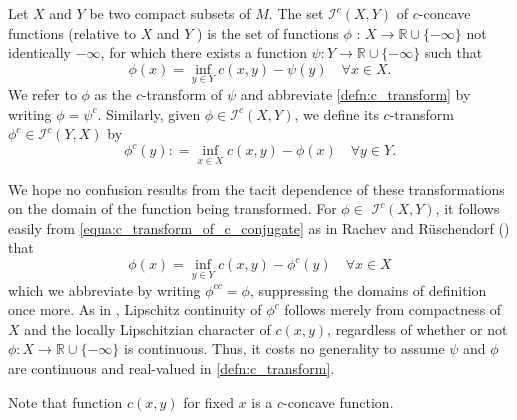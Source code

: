 \begin{defn} 
	Let \( X \) and \( Y \) be two compact subsets of \( M \).
	The set \( \mathcal{I} ^ { c } ( X , Y ) \) of \( c \)-concave functions (relative to \( X \) and \( Y \) ) is
	the set of functions \( \phi \) : \( X \rightarrow \mathbb { R } \cup \{ - \infty \} \) not identically \( - \infty \),
	for which there exists a function \( \psi : Y \rightarrow \mathbb { R } \cup \{ - \infty \} \) such that
	\begin{equation}
		\label{defn:c_transform}
		\phi ( x ) = \inf _ { y \in Y } c ( x , y ) - \psi ( y ) \quad \forall x \in X.
	\end{equation}
	We refer to \( \phi \) as the \( c \)-transform of \( \psi \) and abbreviate \cref{defn:c_transform}
	by writing \( \phi = \psi ^ { c } \).
	Similarly, given \( \phi \in \mathcal{I} ^ { c } ( X , Y ) \),
	we define its \( c \)-transform \( \phi ^ { c } \in \mathcal{I} ^ { c } ( Y , X ) \) by
	\begin{equation}
		\label{equa:c_transform_of_c_conjugate}
		\phi ^ { c } ( y ) : = \inf _ { x \in X } c ( x , y ) - \phi ( x ) \quad \forall y \in Y.
	\end{equation}
\end{defn}

We hope no confusion results from the tacit dependence of
these transformations on the domain of the function being transformed.
For \( \phi \in \) \( \mathcal { I } ^ { c } ( X , Y ) \),
it follows easily from \cref{equa:c_transform_of_c_conjugate} as in Rachev and Rüschendorf
(\cite[Section 3.3]{Rachev1998}) that
\[ \phi ( x ) = \inf _ { y \in Y } c ( x , y ) - \phi ^ { c } ( y ) \quad \forall x \in X \]
which we abbreviate by writing \( \phi ^ { c c } = \phi \), suppressing the domains of definition once more.
As in \cite{mccann2001polar}, Lipschitz continuity of \( \phi ^ { c } \) follows merely from
compactness of \( X \) and the locally Lipschitzian character of \( c ( x , y ) \),
regardless of whether or not \( \phi : X \rightarrow \mathbb { R } \cup \{ - \infty \} \) is continuous.
Thus, it costs no generality to
assume \( \psi \) and \( \phi \) are continuous and real-valued in \cref{defn:c_transform}.

Note that function $c(x,y)$ for fixed $x$ is a $c$-concave function.

